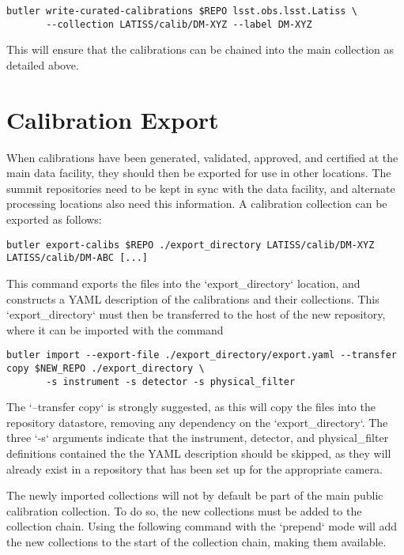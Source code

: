 \documentclass[DM,authoryear,toc]{lsstdoc}
\begin{document}
\begin{verbatim}
butler write-curated-calibrations $REPO lsst.obs.lsst.Latiss \
       --collection LATISS/calib/DM-XYZ --label DM-XYZ
\end{verbatim}

This will ensure that the calibrations can be chained into the main collection as detailed above.

\section{Calibration Export}

When calibrations have been generated, validated, approved, and certified at the main data facility, they should then be exported for use in other locations.  The summit repositories need to be kept in sync with the data facility, and alternate processing locations also need this information.  A calibration collection can be exported as follows:

\begin{verbatim}
butler export-calibs $REPO ./export_directory LATISS/calib/DM-XYZ LATISS/calib/DM-ABC [...]
\end{verbatim}

This command exports the files into the `export_directory` location, and constructs a YAML description of the calibrations and their collections.  This `export_directory` must then be transferred to the host of the new repository, where it can be imported with the command

\begin{verbatim}
butler import --export-file ./export_directory/export.yaml --transfer copy $NEW_REPO ./export_directory \
       -s instrument -s detector -s physical_filter
\end{verbatim}

The `--transfer copy` is strongly suggested, as this will copy the files into the repository datastore, removing any dependency on the `export_directory`.  The three `-s` arguments indicate that the instrument, detector, and physical_filter definitions contained the the YAML description should be skipped, as they will already exist in a repository that has been set up for the appropriate camera.

The newly imported collections will not by default be part of the main public calibration collection.  To do so, the new collections must be added to the collection chain.  Using the following command with the `prepend` mode will add the new collections to the start of the collection chain, making them available.
\end{document}
